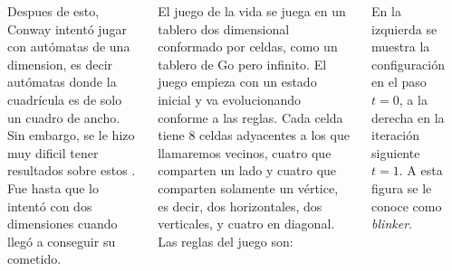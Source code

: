 \documentclass[20pt,margin=2.2cm,innermargin=-4.5in,blockverticalspace=-0.25in]{tikzposter}
\begin{document}
\begin{columns}
{{        }

        \vspace{5mm}
        Despues de esto, Conway intent\'o jugar con aut\'omatas de una dimension, es decir aut\'omatas donde la cuadr\'icula es de solo un cuadro de ancho. Sin embargo, se le hizo muy dificil tener resultados sobre estos \cite{Roberts2015-ur}. Fue hasta que lo intent\'o con dos dimensiones cuando lleg\'o a conseguir su cometido.

        El juego de la vida se juega en un tablero dos dimensional conformado por celdas, como un tablero de Go pero infinito. El juego empieza con un estado inicial y va evolucionando conforme a las reglas. Cada celda tiene 8 celdas adyacentes a los que llamaremos vecinos, cuatro que comparten un lado y cuatro que comparten solamente un v\'ertice, es decir, dos horizontales, dos verticales, y cuatro en diagonal. Las reglas del juego son:
        \vspace{7mm}
        

        \vspace{5mm}
        En la izquierda se muestra la configuraci\'on en el paso $t=0$, a la derecha en la iteraci\'on siguiente $t=1$. A esta figura se le conoce como \textit{blinker}.
        \vspace{7mm}

}
\end{columns}
\end{document}
